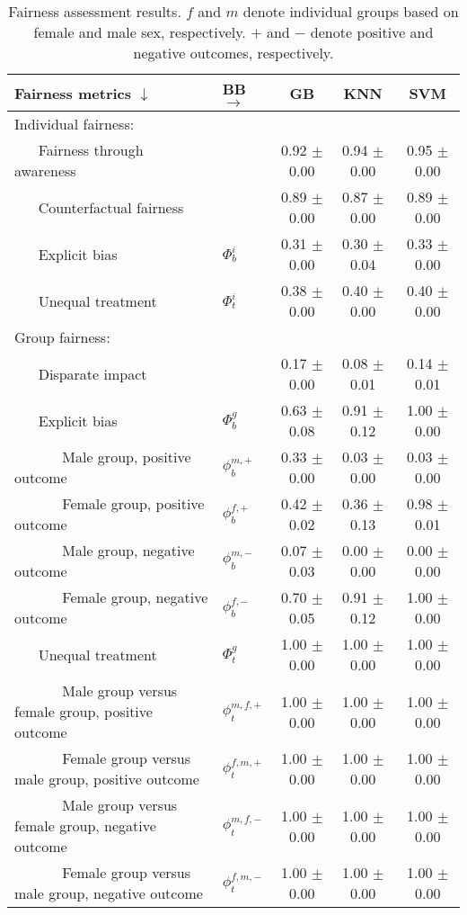 \documentclass[letterpaper]{article} %
\begin{document}
\begin{table*}[t!]
	\begin{center}{\caption{Fairness assessment results. $f$ and $m$ denote individual groups based on female and male sex, respectively. $+$ and $-$ denote positive and negative outcomes, respectively.}\label{tab:res}}
		\begin{tabular}{ll|c|c|c}
			\toprule
			Fairness metrics $\downarrow$ & BB $\rightarrow$ & GB & KNN & SVM \\
			\midrule
			Individual fairness: & & & & \\
			~ ~ Fairness through awareness & & 0.92 $\pm$ 0.00 & 0.94 $\pm$ 0.00 & 0.95 $\pm$ 0.00 \\
			~ ~ Counterfactual fairness & & 0.89 $\pm$ 0.00 & 0.87 $\pm$ 0.00 & 0.89 $\pm$ 0.00 \\
			~ ~ Explicit bias & $\Phi_b^i$ & 0.31 $\pm$ 0.00 & 0.30 $\pm$ 0.04 & 0.33 $\pm$ 0.00 \\
			~ ~ Unequal treatment & $\Phi_t^i$ & 0.38 $\pm$ 0.00 & 0.40 $\pm$ 0.00 & 0.40 $\pm$ 0.00 \\
			\midrule
			Group fairness: & & & & \\
			~ ~ Disparate impact & & 0.17 $\pm$ 0.00 & 0.08 $\pm$ 0.01 & 0.14 $\pm$ 0.01 \\
			~ ~ Explicit bias & $\Phi_b^g$ & 0.63 $\pm$ 0.08 & 0.91 $\pm$ 0.12 & 1.00 $\pm$ 0.00 \\
			~ ~ ~ ~ Male group, positive outcome & $\phi_b^{m,+}$ & 0.33 $\pm$ 0.00 & 0.03 $\pm$ 0.00 & 0.03 $\pm$ 0.00 \\
			~ ~ ~ ~ Female group, positive outcome & $\phi_b^{f,+}$ & 0.42 $\pm$ 0.02 & 0.36 $\pm$ 0.13 & 0.98 $\pm$ 0.01 \\
			~ ~ ~ ~ Male group, negative outcome & $\phi_b^{m,-}$ & 0.07 $\pm$ 0.03 & 0.00 $\pm$ 0.00 & 0.00 $\pm$ 0.00 \\
			~ ~ ~ ~ Female group, negative outcome & $\phi_b^{f,-}$ & 0.70 $\pm$ 0.05 & 0.91 $\pm$ 0.12 & 1.00 $\pm$ 0.00 \smallskip \\
			~ ~ Unequal treatment & $\Phi_t^g$ & 1.00 $\pm$ 0.00 & 1.00 $\pm$ 0.00 & 1.00 $\pm$ 0.00 \\
			~ ~ ~ ~ Male group versus female group, positive outcome & $\phi_t^{m,f,+}$ & 1.00 $\pm$ 0.00 & 1.00 $\pm$ 0.00 & 1.00 $\pm$ 0.00 \\
			~ ~ ~ ~ Female group versus male group, positive outcome & $\phi_t^{f,m,+}$ & 1.00 $\pm$ 0.00 & 1.00 $\pm$ 0.00 & 1.00 $\pm$ 0.00 \\
			~ ~ ~ ~ Male group versus female group, negative outcome & $\phi_t^{m,f,-}$ & 1.00 $\pm$ 0.00 & 1.00 $\pm$ 0.00 & 1.00 $\pm$ 0.00 \\
			~ ~ ~ ~ Female group versus male group, negative outcome & $\phi_t^{f,m,-}$ & 1.00 $\pm$ 0.00 & 1.00 $\pm$ 0.00 & 1.00 $\pm$ 0.00 \\
			\bottomrule
		\end{tabular}
	\end{center}
\end{table*}
\end{document}
